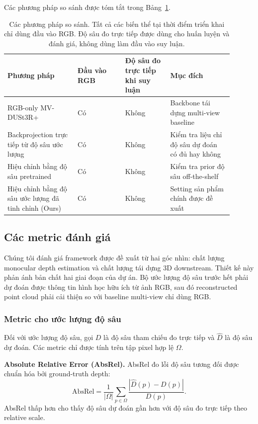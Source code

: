 \documentclass[12pt,a4paper]{article}
\newcommand{\mvdp}{MV-DUSt3R+}
\begin{document}
Các phương pháp so sánh được tóm tắt trong Bảng~\ref{tab:methods}.
\begin{table}[H]
\centering
\renewcommand{\arraystretch}{1.2}
\begin{tabular}{p{0.28\linewidth}p{0.19\linewidth}p{0.18\linewidth}p{0.25\linewidth}}
\toprule
Phương pháp & Đầu vào RGB & Độ sâu đo trực tiếp khi suy luận & Mục đích \\
\midrule
RGB-only \mvdp{} & Có & Không & Backbone tái dựng multi-view baseline \\
Backprojection trực tiếp từ độ sâu ước lượng & Có & Không & Kiểm tra liệu chỉ độ sâu dự đoán có đủ hay không \\
Hiệu chỉnh bằng độ sâu pretrained & Có & Không & Kiểm tra prior độ sâu off-the-shelf \\
Hiệu chỉnh bằng độ sâu ước lượng đã tinh chỉnh (Ours) & Có & Không & Setting sản phẩm chính được đề xuất \\
\bottomrule
\end{tabular}
\caption{Các phương pháp so sánh. Tất cả các biến thể tại thời điểm triển khai chỉ dùng đầu vào RGB. Độ sâu đo trực tiếp được dùng cho huấn luyện và đánh giá, không dùng làm đầu vào suy luận.}
\label{tab:methods}
\end{table}

\subsection{Các metric đánh giá}
Chúng tôi đánh giá framework được đề xuất từ hai góc nhìn: chất lượng monocular depth estimation và chất lượng tái dựng 3D downstream. Thiết kế này phản ánh bản chất hai giai đoạn của dự án. Bộ ước lượng độ sâu trước hết phải dự đoán được thông tin hình học hữu ích từ ảnh RGB, sau đó reconstructed point cloud phải cải thiện so với baseline multi-view chỉ dùng RGB.

\subsubsection{Metric cho ước lượng độ sâu}
Đối với ước lượng độ sâu, gọi $D$ là độ sâu tham chiếu đo trực tiếp và $\hat{D}$ là độ sâu dự đoán. Các metric chỉ được tính trên tập pixel hợp lệ $\Omega$.

\textbf{Absolute Relative Error (AbsRel).} AbsRel đo lỗi độ sâu tương đối được chuẩn hóa bởi ground-truth depth:
\begin{equation}
\mathrm{AbsRel} = \frac{1}{|\Omega|}\sum_{p\in\Omega} \frac{|\hat{D}(p)-D(p)|}{D(p)}.
\end{equation}
AbsRel thấp hơn cho thấy độ sâu dự đoán gần hơn với độ sâu đo trực tiếp theo relative scale.
\end{document}
